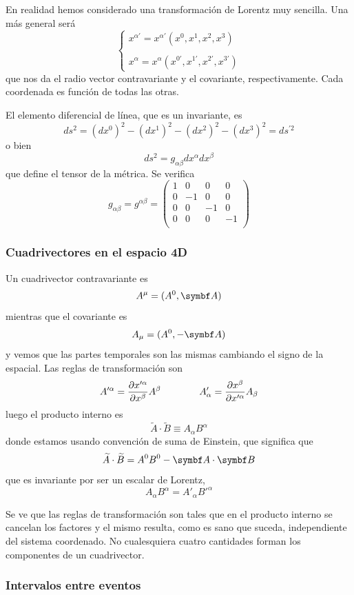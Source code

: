 \documentclass[10pt,oneside]{CBFT_book}
\begin{document}
En realidad hemos considerado una transformación de Lorentz muy sencilla. Una 
más general será
\[
	\begin{cases}
	x^{\alpha'} = x^{\alpha'}(x^0, x^1, x^2, x^3) \\
	\\
	x^{\alpha} = x^{\alpha}(x^{0'}, x^{1'}, x^{2'}, x^{3'})
	\end{cases}
\]
que nos da el radio vector contravariante y el covariante, respectivamente.
Cada coordenada es función de todas las otras.


El elemento diferencial de línea, que es un invariante, es 
\[
	ds^2 = (dx^0)^2 - (dx^1)^2 - (dx^2)^2 - (dx^3)^2 = ds^{'2}
\]
o bien 
\[
	ds^2 = g_{\alpha\beta}dx^{\alpha}dx^{\beta}
\]
que define el tensor de la métrica. Se verifica
\[
	g_{\alpha\beta} = g^{\alpha\beta} =
	\begin{pmatrix}
	 1 & 0 & 0 & 0 \\
	 0 & -1 & 0 & 0 \\
	 0 & 0 & -1 & 0 \\
	 0 & 0 & 0 & -1 \\
	\end{pmatrix}
\]

\subsubsection{Cuadrivectores en el espacio 4D}

Un cuadrivector contravariante es
\[
	A^{\mu} = ( A^0, \vb{A})
\]
mientras que el covariante es
\[
	A_{\mu} = ( A^0, -\vb{A})
\]
y vemos que las partes temporales son las mismas cambiando el signo de la espacial. Las reglas de 
transformación son
\[
	A'^{\alpha}= \frac{\partial^{\hspace{-0.05em}} {x'^{\alpha}}}{\partial {x^{\beta}}^{\hspace{-0.05em}}} A^{\beta} \qquad\qquad 
		A'_{\alpha}= \frac{\partial^{\hspace{-0.05em}} {x^{\beta}}}{\partial {x'^{\alpha}}^{\hspace{-0.05em}}} A_{\beta}
\]
luego el producto interno es
\[
	\widetilde{A}\cdot\widetilde{B} \equiv A_\alpha B^\alpha
\]
donde estamos usando convención de suma de Einstein, que significa que 
\[
	\widetilde{A}\cdot\widetilde{B} = A^0 B^0 -\pe{A}{B}
\]
que es invariante por ser un escalar de Lorentz,
\[
	A_\alpha B^\alpha = A'_\alpha B'^\alpha
\]

Se ve que las reglas de transformación son tales que en el producto interno se cancelan los factores
y el mismo resulta, como es sano que suceda, independiente del sistema coordenado.
No cualesquiera cuatro cantidades forman los componentes de un cuadrivector.

\subsubsection{Intervalos entre eventos}
\end{document}
